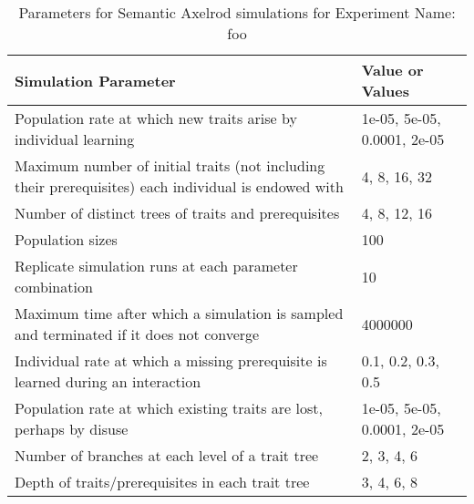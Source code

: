 \begin{table}[h]
\begin{tabular}{|p{}|p{}|}
\hline
\textbf{Simulation Parameter} & \textbf{Value or Values} \\ 
\hline
Population rate at which new traits arise by individual learning & 1e-05, 5e-05, 0.0001, 2e-05\\ 
 \hline 
Maximum number of initial traits (not including their prerequisites) each individual is endowed with & 4, 8, 16, 32\\ 
 \hline 
Number of distinct trees of traits and prerequisites & 4, 8, 12, 16\\ 
 \hline 
Population sizes & 100\\ 
 \hline 
Replicate simulation runs at each parameter combination & 10\\ 
 \hline 
Maximum time after which a simulation is sampled and terminated if it does not converge & 4000000\\ 
 \hline 
Individual rate at which a missing prerequisite is learned during an interaction & 0.1, 0.2, 0.3, 0.5\\ 
 \hline 
Population rate at which existing traits are lost, perhaps by disuse & 1e-05, 5e-05, 0.0001, 2e-05\\ 
 \hline 
Number of branches at each level of a trait tree & 2, 3, 4, 6\\ 
 \hline 
Depth of traits/prerequisites in each trait tree & 3, 4, 6, 8\\ 
 \hline 
\hline
\end{tabular}
\caption{Parameters for Semantic Axelrod simulations for Experiment Name: foo}
\label{tab:axelrodct-sim-parameters}
\end{table}

